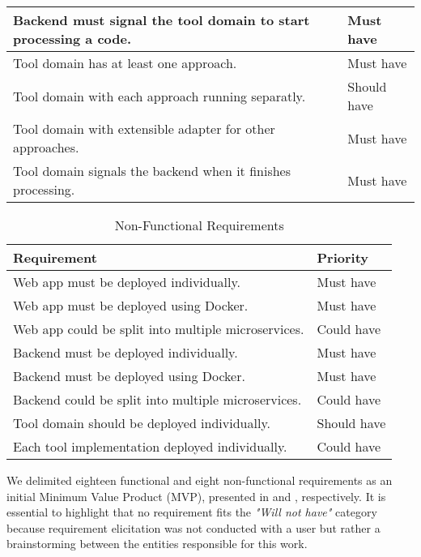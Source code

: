 \begin{table}[!htb]
\begin{center}
\begin{tabular}[c]{p{16em}|p{8em}}
      \hline Backend must signal the tool domain to start processing a code. & {Must have} \\
      \hline Tool domain has at least one approach. & {Must have} \\
      \hline Tool domain with each approach running separatly. & {Should have} \\
      \hline Tool domain with extensible adapter for other approaches. & {Must have} \\
      \hline Tool domain signals the backend when it finishes processing. & {Must have} \\
    \end{tabular}
  \end{center}
\end{table}

\begin{table}[!htb] \caption{Non-Functional Requirements} \label{tab:non-functional-requirements}
  \begin{center}
    \begin{tabular}[c]{p{16em}|p{8em}}
      \textbf{Requirement} &
      \textbf{Priority} \\
      \hline Web app must be deployed individually. & {Must have} \\
      \hline Web app must be deployed using Docker. & {Must have} \\
      \hline Web app could be split into multiple microservices. & {Could have} \\
      \hline Backend must be deployed individually. & {Must have} \\
      \hline Backend must be deployed using Docker. & {Must have} \\
      \hline Backend could be split into multiple microservices. & {Could have} \\
      \hline Tool domain should be deployed individually. & {Should have} \\
      \hline Each tool implementation deployed individually. & {Could have} \\
    \end{tabular}
  \end{center}
\end{table}

We delimited eighteen functional and eight non-functional requirements as an
initial Minimum Value Product (MVP), presented in
 and ,
respectively. It is essential to highlight that no requirement fits the
\textit{"Will not have"} category because requirement elicitation was not
conducted with a user but rather a brainstorming between the entities
responsible for this work.
